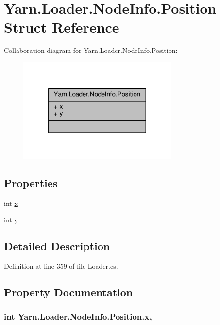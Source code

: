 \hypertarget{a00141}{\section{Yarn.\-Loader.\-Node\-Info.\-Position Struct Reference}
\label{a00141}
}


Collaboration diagram for Yarn.\-Loader.\-Node\-Info.\-Position\-:
\nopagebreak
\begin{figure}[H]
\begin{center}
\leavevmode
\includegraphics[width=228pt]{a00647}
\end{center}
\end{figure}
\subsection*{Properties}
\begin{DoxyCompactItemize}
\item 
int \hyperlink{a00141_a6b40110781090293fbcd2d6f7695ae4d}{x}
\item 
int \hyperlink{a00141_a390d560bd9faa3a32d8a0489c69be9e0}{y}
\end{DoxyCompactItemize}


\subsection{Detailed Description}


Definition at line 359 of file Loader.\-cs.



\subsection{Property Documentation}
\hypertarget{a00141_a6b40110781090293fbcd2d6f7695ae4d}{
\subsubsection[{x}]{\setlength{\rightskip}{0pt plus 5cm}int Yarn.\-Loader.\-Node\-Info.\-Position.\-x\hspace{0.3cm}{\ttfamily [get]}, {\ttfamily [set]}}}\label{a00141_a6b40110781090293fbcd2d6f7695ae4d}


